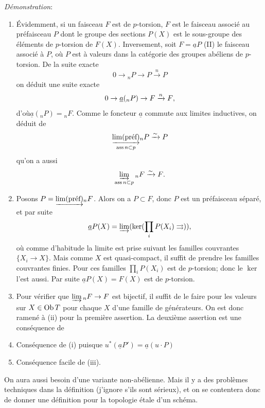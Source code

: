 \documentclass[10pt]{../fichiers-configuration-latex/smfart}
\begin{document}
\noindent
\emph{Démonstration}:
\begin{enumerate}
\renewcommand{\theenumi}{\roman{enumi}}
\renewcommand{\labelenumi}{(\theenumi)}
\item Évidemment, si un faisceau $F$ est de $p$-torsion, $F$ est le
  faisceau associé au préfaisceau $P$ dont le groupe des sections
  $P(X)$ est le sous-groupe des éléments de $p$-torsion de
  $F(X)$. Inversement, soit $F=\underline{a}P$ (II) le faisceau associé à $P$,
  où $P$ est à valeurs dans la catégorie des groupes abéliens de
  $p$-torsion. De la suite exacte
$$
0\rightarrow {}_nP \rightarrow P\xrightarrow{n}P
$$
on déduit une suite exacte
$$
0\rightarrow \underline{a}({}_nP)\rightarrow F\xrightarrow{n}F{},
$$
d'où\pageoriginale $\underline{a}({}_nP)={}_nF$. Comme le foncteur $\underline{a}$
commute aux limites inductives, on déduit de
$$
\underset{\operatorname{ass} n\subset p}{\underrightarrow{\lim(\text{\rm préf})}}{}_nP\xrightarrow{\sim}P
$$
qu'on a aussi
$$
\varinjlim_{\operatorname{ass} n\subset p} {}_nF\xrightarrow{\sim}F{}.
$$

\item Posons $P=\underrightarrow{\lim(\text{\rm préf})}{}_n F$. Alors on a
  $P\subset F$, donc $P$ est un préfaisceau séparé, et par suite
$$
\underline{a}P(X)=\varinjlim (\ker(\prod_i P(X_i)\rightrightarrows)){},
$$
où comme d'habitude la limite est prise suivant les familles
couvrantes $\{X_i\rightarrow X\}$. Mais comme $X$ est quasi-compact,
il suffit de prendre les familles couvrantes finies. Pour ces familles
$\prod_iP(X_i)$ est de $p$-torsion; donc le $\ker$ l'est aussi. Par
suite $\underline{a}P(X)=F(X)$ est de $p$-torsion.

\item Pour vérifier que $\varinjlim {}_nF\rightarrow F$ est bijectif,
  il suffit de le faire pour les valeurs sur $X\in \operatorname{Ob} T$ pour chaque
  $X$ d'une famille de générateurs. On est donc ramené à (ii) pour la
  première assertion. La deuxième assertion est une conséquence de

\item Conséquence de (i) puisque $u^{\ast}(\underline{a}P')=\underline{a}(u\cdot P)$

\item Conséquence facile de (iii).
\end{enumerate}

On aura aussi besoin d'une variante non-abélienne. Mais il y a des
problèmes techniques dans la définition (j'ignore s'ils sont sérieux),
et on se contentera donc de donner une définition pour la topologie
étale d'un schéma.
\end{document}
